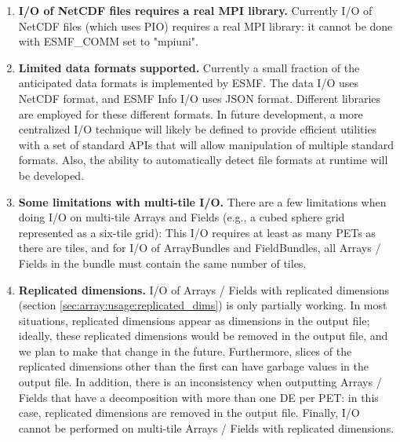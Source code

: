 
\begin{enumerate}

\item {\bf I/O of NetCDF files requires a real MPI library.}
Currently I/O of NetCDF files (which uses PIO) requires a real MPI
library: it cannot be done with ESMF\_COMM set to "mpiuni".

\item {\bf Limited data formats supported.}
Currently a small fraction of the anticipated data formats is implemented by 
ESMF.  The data I/O uses NetCDF format, and ESMF Info
I/O uses JSON format.  Different libraries are employed for these
different formats.  In future development, a more centralized I/O technique
will likely be defined to provide efficient utilities with a set of standard
APIs that will allow manipulation of multiple standard formats.  Also, the 
ability to automatically detect file formats at runtime will be developed.

\item {\bf Some limitations with multi-tile I/O.}
There are a few limitations when doing I/O on multi-tile Arrays and
Fields (e.g., a cubed sphere grid represented as a six-tile grid): This
I/O requires at least as many PETs as there are tiles, and for I/O of
ArrayBundles and FieldBundles, all Arrays / Fields in the bundle must
contain the same number of tiles.

\item {\bf Replicated dimensions.}
I/O of Arrays / Fields with replicated dimensions (section
\ref{sec:array:usage:replicated_dims}) is only partially working. In
most situations, replicated dimensions appear as dimensions in the
output file; ideally, these replicated dimensions would be removed in
the output file, and we plan to make that change in the future.
Furthermore, slices of the replicated dimensions other than the first
can have garbage values in the output file. In addition, there is an
inconsistency when outputting Arrays / Fields that have a decomposition
with more than one DE per PET: in this case, replicated dimensions are
removed in the output file. Finally, I/O cannot be performed on
multi-tile Arrays / Fields with replicated dimensions.

\end{enumerate}
